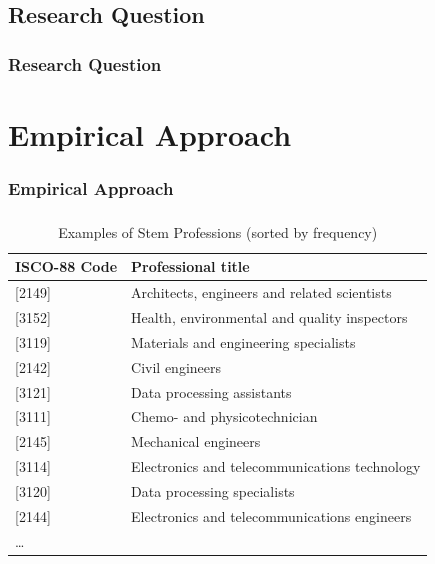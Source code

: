 \documentclass[11pt, aspectratio=1610, xcolor={dvipsnames}]{beamer}
\begin{document}
	\begin{frame}
		\frametitle{}
	\end{frame}
	
	\subsection{Research Question}
	\begin{frame}
		\frametitle{Research Question}
	\end{frame}
	
	\begin{frame}
		\frametitle{}
	\end{frame}
	
	\section{Empirical Approach}
	\begin{frame}
		\frametitle{Empirical Approach}
	\end{frame}
	
	\begin{frame}
		\frametitle{}
		
		{\small
			\begin{table}[h]
				\centering
				\caption{Examples of Stem Professions (sorted by frequency)}
				\label{tab:stem_examples}
	
				\begin{tabular}{l l}
					\toprule
					ISCO-88 Code & Professional title\\
					\midrule
					{[2149]} & Architects, engineers and related scientists \\
					{[3152]} & Health, environmental and quality inspectors\\
					{[3119]} & Materials and engineering specialists\\
					{[2142]} & Civil engineers\\
					{[3121]} & Data processing assistants\\
					{[3111]} & Chemo- and physicotechnician\\
					{[2145]} & Mechanical engineers\\
					{[3114]} & Electronics and telecommunications technology\\
					{[3120]} & Data processing specialists\\
					{[2144]} & Electronics and telecommunications engineers\\
					… &\\
					\bottomrule
				\end{tabular}
			\end{table}
		}
		
	\end{frame}
	
\end{document}
